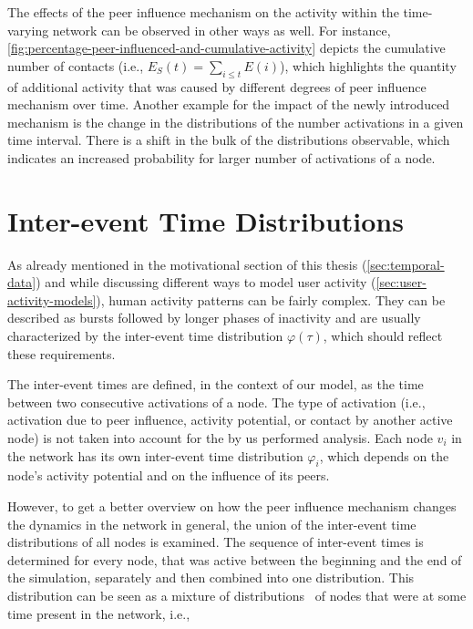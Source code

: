 The effects of the peer influence mechanism on the activity within the time-varying network can be observed in other ways as well.
For instance, \cref{fig:percentage-peer-influenced-and-cumulative-activity} depicts the cumulative number of contacts (i.e., \( E_{S}(t) = \sum_{i \leq t} E(i) \)), which highlights the quantity of additional activity that was caused by different degrees of peer influence mechanism over time.
Another example for the impact of the newly introduced mechanism is the change in the distributions of the number activations in a given time interval.
There is a shift in the bulk of the distributions observable, which indicates an increased probability for larger number of activations of a node.




\section{Inter-event Time Distributions}
\label{sec:inter-event-time-dists}

As already mentioned in the motivational section of this thesis (\cref{sec:temporal-data}) and while discussing different ways to model user activity (\cref{sec:user-activity-models}), human activity patterns can be fairly complex.
They can be described as bursts followed by longer phases of inactivity and are usually characterized by the inter-event time distribution \( \varphi(\tau) \), which should reflect these requirements.

The inter-event times are defined, in the context of our model, as the time between two consecutive activations of a node.
The type of activation (i.e., activation due to peer influence, activity potential, or contact by another active node) is not taken into account for the by us performed analysis.
Each node \( v_{i} \) in the network has its own inter-event time distribution \( \varphi_{i} \), which depends on the node's activity potential and on the influence of its peers.

However, to get a better overview on how the peer influence mechanism changes the dynamics in the network in general, the union of the inter-event time distributions of all nodes is examined.
The sequence of inter-event times is determined for every node, that was active between the beginning and the end of the simulation, separately and then combined into one distribution.
This distribution can be seen as a mixture of distributions~\cite{Seidel2011} of nodes that were at some time present in the network, i.e.,

